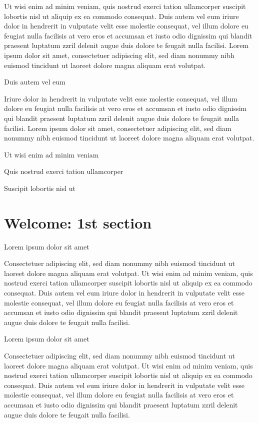 \documentclass[11pt,twoside]{article}\makeatletter
\makeatletter
\renewcommand\section{\@startsection {section}{1}{\z@}%
     {-1.75ex \@plus -0.5ex \@minus -.2ex}%
     {0.5ex \@plus .2ex}%
     {\reset@font\Large\bfseries\sffamily}}
\def\chaptername{Chapter}
\def\mainmatter{%
  \cleardoublepage
  \def\thechapter{\@arabic\c@chapter}
  \setcounter{chapter}{0}
  \setcounter{section}{0}
  \pagenumbering{arabic}
  \setcounter{secnumdepth}{6}
  \def\@chapapp{\chaptername}%
  \def\theHchapter{\arabic{chapter}}
}
\def\DivI{\section}
\def\DivI{\chapter}
\makeatother
\begin{document}
Ut wisi enim ad minim veniam, quis nostrud exerci tation       ullamcorper suscipit lobortis nisl ut aliquip ex ea commodo       consequat. Duis autem vel eum iriure dolor in hendrerit in vulputate       velit esse molestie consequat, vel illum dolore eu feugiat nulla       facilisis at vero eros et accumsan et iusto odio dignissim qui blandit       praesent luptatum zzril delenit augue duis dolore te feugait nulla       facilisi. Lorem ipsum dolor sit amet, consectetuer adipiscing elit,       sed diam nonummy nibh euismod tincidunt ut laoreet dolore magna       aliquam erat volutpat. \par
Duis autem vel eum \par
Iriure dolor in hendrerit in vulputate velit esse molestie       consequat, vel illum dolore eu feugiat nulla facilisis at vero eros et       accumsan et iusto odio dignissim qui blandit praesent luptatum zzril       delenit augue duis dolore te feugait nulla facilisi. Lorem ipsum dolor       sit amet, consectetuer adipiscing elit, sed diam nonummy nibh euismod       tincidunt ut laoreet dolore magna aliquam erat volutpat. \par
Ut wisi enim ad minim veniam\par
Quis nostrud exerci tation ullamcorper \par
Suscipit lobortis nisl ut \mainmatter 
\DivI[Welcome: 1st section]{Welcome: 1st section}\label{part1}\par
Lorem ipsum dolor sit amet\par
Consectetuer adipiscing elit, sed diam nonummy nibh euismod       tincidunt ut laoreet dolore magna aliquam erat volutpat. Ut wisi enim       ad minim veniam, quis nostrud exerci tation ullamcorper suscipit       lobortis nisl ut aliquip ex ea commodo consequat. Duis autem vel eum       iriure dolor in hendrerit in vulputate velit esse molestie consequat,       vel illum dolore eu feugiat nulla facilisis at vero eros et accumsan       et iusto odio dignissim qui blandit praesent luptatum zzril delenit       augue duis dolore te feugait nulla facilisi.\par
Lorem ipsum dolor sit amet\par
Consectetuer adipiscing elit, sed diam nonummy nibh euismod       tincidunt ut laoreet dolore magna aliquam erat volutpat. Ut wisi enim       ad minim veniam, quis nostrud exerci tation ullamcorper suscipit       lobortis nisl ut aliquip ex ea commodo consequat. Duis autem vel eum       iriure dolor in hendrerit in vulputate velit esse molestie consequat,       vel illum dolore eu feugiat nulla facilisis at vero eros et accumsan       et iusto odio dignissim qui blandit praesent luptatum zzril delenit       augue duis dolore te feugait nulla facilisi.\par
\end{document}
